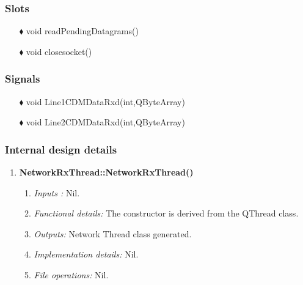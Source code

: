 \begin{enumerate}
\subsubsection{Slots}
\begin{enumerate}
	\item [$\blacklozenge$] void readPendingDatagrams()
	\item [$\blacklozenge$] void closesocket()
\end{enumerate}

\subsubsection{Signals}
\begin{enumerate}
	\item [$\blacklozenge$] void Line1CDMDataRxd(int,QByteArray)
	\item [$\blacklozenge$] void Line2CDMDataRxd(int,QByteArray)
\end{enumerate}


\subsubsection{Internal design details }
\begin{enumerate}
	\item  \textbf{NetworkRxThread::NetworkRxThread()}
	\begin{enumerate}
		\item \textit{Inputs :} Nil.
		\item \textit{Functional details:} The constructor is derived from the QThread class.
		\item \textit{Outputs:} Network Thread class generated.
		\item \textit{Implementation details:} Nil.
		\item \textit{File operations:} Nil.
	\end{enumerate}
	

\end{enumerate}
\end{enumerate}
